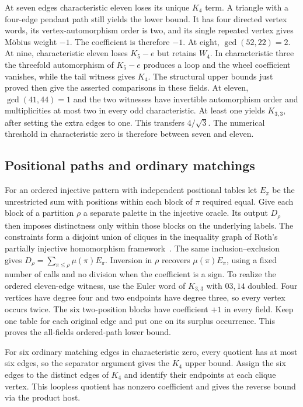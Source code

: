 \documentclass[11pt,letterpaper]{article}
\begin{document}
At seven edges characteristic eleven loses its unique \(K_4\) term. A triangle with a four-edge pendant path still yields the lower bound. It has four directed vertex words, its vertex-automorphism order is two, and its single repeated vertex gives Möbius weight \(-1\). The coefficient is therefore \(-1\). At eight, \(\gcd(52,22)=2\). At nine, characteristic eleven loses \(K_5-e\) but retains \(W_4\). In characteristic three the threefold automorphism of \(K_5-e\) produces a loop and the wheel coefficient vanishes, while the tail witness gives \(K_4\). The structural upper bounds just proved then give the asserted comparisons in these fields. At eleven, \(\gcd(41,44)=1\) and the two witnesses have invertible automorphism order and multiplicities at most two in every odd characteristic. At least one yields \(K_{3,3}\), after setting the extra edges to one. This transfers \(4/\sqrt3\). The numerical threshold in characteristic zero is therefore between seven and eleven.

\subsection{Positional paths and ordinary matchings}\label{positional-paths-and-ordinary-matchings}

For an ordered injective pattern with independent positional tables let \(E_\pi\) be the unrestricted sum with positions within each block of \(\pi\) required equal. Give each block of a partition \(\rho\) a separate palette in the injective oracle. Its output \(D_\rho\) then imposes distinctness only within those blocks on the underlying labels. The constraints form a disjoint union of cliques in the inequality graph of Roth's partially injective homomorphism framework~\cite{roth-partial-hom}. The same inclusion--exclusion gives \(D_\rho=\sum_{\pi\le\rho}\mu(\pi)E_\pi\). Inversion in \(\rho\) recovers \(\mu(\pi)E_\pi\), using a fixed number of calls and no division when the coefficient is a sign. To realize the ordered eleven-edge witness, use the Euler word of \(K_{3,3}\) with \(03,14\) doubled. Four vertices have degree four and two endpoints have degree three, so every vertex occurs twice. The six two-position blocks have coefficient \(+1\) in every field. Keep one table for each original edge and put one on its surplus occurrence. This proves the all-fields ordered-path lower bound.

For six ordinary matching edges in characteristic zero, every quotient has at most six edges, so the separator argument gives the \(K_4\) upper bound. Assign the six edges to the distinct edges of \(K_4\) and identify their endpoints at each clique vertex. This loopless quotient has nonzero coefficient and gives the reverse bound via the product host.
\end{document}
